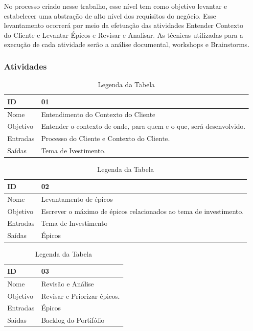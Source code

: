 No processo criado nesse trabalho, esse nível tem como objetivo levantar e estabelecer
uma abstração de alto nível dos requisitos do negócio. Esse levantamento ocorrerá
por meio da efetuação das atividades Entender Contexto do Cliente e Levantar Épicos
e Revisar e Analisar. As técnicas utilizadas para a execução de cada atividade serão
a análise documental, workshops e Brainstorms.


\subsubsection{Atividades}

  \begin{table}[H]
    \centering
      \begin{tabular}{| m{5em} | m{10cm} |}
        \hline
        ID       & 01   \\ \hline
        Nome     & Entendimento do Contexto do Cliente   \\ \hline
        Objetivo & Entender o contexto de onde, para quem e o que, será desenvolvido. \\ \hline
        Entradas & Processo do Cliente e Contexto do Cliente.   \\ \hline
        Saídas   & Tema de Ivestimento. \\ \hline
      \end{tabular}
      \caption{Legenda da Tabela}
      \label{tabela:atividade1}
  \end{table}

  \begin{table}[H]
    \centering
      \begin{tabular}{| m{5em} | m{10cm} |}
        \hline
        ID       & 02   \\ \hline
        Nome     & Levantamento de épicos   \\ \hline
        Objetivo & Escrever o máximo de épicos relacionados ao tema de investimento. \\ \hline
        Entradas & Tema de Investimento   \\ \hline
        Saídas   & Épicos \\ \hline
      \end{tabular}
      \caption{Legenda da Tabela}
      \label{tabela:atividade2}
  \end{table}

  \begin{table}[H]
    \centering
      \begin{tabular}{| m{5em} | m{10cm} |}
        \hline
        ID       & 03   \\ \hline
        Nome     & Revisão e Análise   \\ \hline
        Objetivo & Revisar e Priorizar épicos. \\ \hline
        Entradas & Épicos   \\ \hline
        Saídas   & Backlog do Portifólio \\ \hline
      \end{tabular}
      \caption{Legenda da Tabela}
      \label{tabela:atividade3}
  \end{table}

